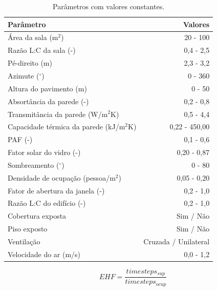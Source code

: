 \documentclass[brazil,hardcopy,openany,a4paper]{ufscthesis}
\begin{document}
		\begin{table}[h]
			\centering
			\caption{Parâmetros com valores constantes.}
			\label{table:param_def}
			\begin{tabular}{|l |r |}
				\hline
				\textbf{Parâmetro} & \textbf{Valores} \\
				\hline
				Área da sala (m$^2$) & 20 - 100 \\
				\hline
				Razão L:C da sala (-) & 0,4 - 2,5 \\
				\hline
				Pé-direito (m) & 2,3 - 3,2 \\
				\hline
				Azimute ($^{\circ}$) & 0 - 360 \\
				\hline
				Altura do pavimento (m) & 0 - 50 \\
				\hline 
				Absortância da parede (-) & 0,2 - 0,8 \\
				\hline 
				Transmitância da parede (W/m$^2$K) & 0,5 - 4,4 \\
				\hline 
				Capacidade térmica da parede (kJ/m$^2$K) & 0,22 - 450,00 \\
				\hline 
				PAF (-) & 0,1 - 0,6 \\
				\hline 
				Fator solar do vidro (-) & 0,20 - 0,87 \\
				\hline 
				Sombreamento ($^{\circ}$) & 0 - 80 \\
				\hline 
				Densidade de ocupação (pessoa/m$^2$) & 0,05 - 0,20 \\
				\hline 
				Fator de abertura da janela (-) & 0,2 - 1,0 \\
				\hline 
				Razão L:C do edifício (-) & 0,2 - 1,0 \\
				\hline 
				Cobertura exposta & Sim / Não\\
				\hline 
				Piso exposto & Sim / Não\\
				\hline 
				Ventilação & Cruzada / Unilateral\\
				\hline 
				Velocidade do ar (m/s) & 0,0 - 1,2 \\
				\hline 
			\end{tabular}
		\end{table}
		
		
		\begin{equation}
		\label{eq:EHF}
		EHF = \frac{timesteps_{sup}}{timesteps_{ocup}}
		\end{equation}
	
\end{document}
